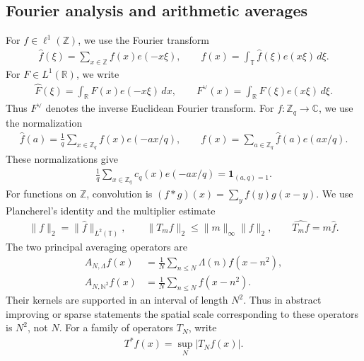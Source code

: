 \documentclass[12pt,reqno]{amsart}
\numberwithin{equation}{section}
\theoremstyle{definition}
\theoremstyle{remark}
\begin{document}
\subsection{Fourier analysis and arithmetic averages}

For \(f\in\ell^1(\mathbb Z)\), we use the Fourier transform
\begin{align}\label{e:FourierZ}
 \widehat f(\xi)
 =\sum_{x\in\mathbb Z}f(x)e(-x\xi),
 \qquad
 f(x)=\int_{\mathbb T}\widehat f(\xi)e(x\xi)\,d\xi.
\end{align}
For \(F\in L^1(\mathbb R)\), we write
\begin{align}\label{e:FourierR}
 \widehat F(\xi)
 =\int_{\mathbb R}F(x)e(-x\xi)\,dx,
 \qquad
 F^\vee(x)
 =\int_{\mathbb R}F(\xi)e(x\xi)\,d\xi.
\end{align}
Thus \(F^\vee\) denotes the inverse Euclidean Fourier transform. For \(f:\mathbb Z_q\to\mathbb C\), we use the normalization
\begin{align}\label{e:FTZp}
 \widehat f(a)
 =\frac1q\sum_{x\in\mathbb Z_q}f(x)e(-ax/q),
 \qquad
 f(x)=\sum_{a\in\mathbb Z_q}\widehat f(a)e(ax/q).
\end{align}
These normalizations give
\begin{align}\label{e:ramnujansumfourier}
 \frac1q\sum_{x\in\mathbb Z_q}c_q(x)e(-ax/q)
 =\mathbf1_{(a,q)=1}.
\end{align}
For functions on $\mathbb Z$, convolution is
$(f*g)(x)=\sum_yf(y)g(x-y)$.  We use Plancherel's identity and the
multiplier estimate
\begin{align}\label{e:plancherel}
 \|f\|_2=\|\widehat f\|_{L^2(\mathbb T)},\qquad
 \|T_mf\|_2\leq\|m\|_\infty\|f\|_2,\qquad
 \widehat{T_mf}=m\widehat f.
\end{align}
The two principal averaging operators are
\begin{align}\label{e:basicaverages}
 A_{N,\Lambda}f(x)&=\frac1N\sum_{n\leq N}\Lambda(n)f(x-n^2),\\
 A_{N,\mathbb N^2}f(x)&=\frac1N\sum_{n\leq N}f(x-n^2).
\end{align}
Their kernels are supported in an interval of length $N^2$.  Thus in
abstract improving or sparse statements the spatial scale corresponding
to these operators is $N^2$, not $N$.  For a family of operators
$T_N$, write
\begin{align*}
 T^*f(x)=\sup_N|T_Nf(x)|.
\end{align*}

\end{document}
